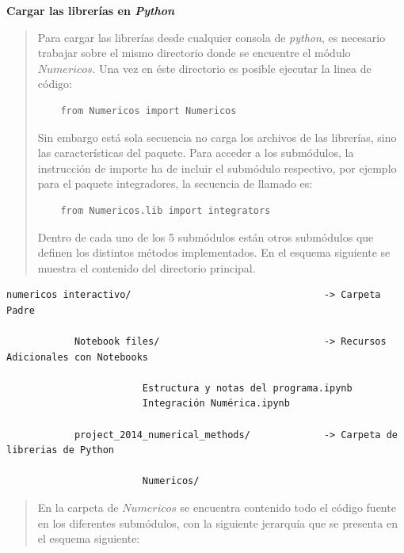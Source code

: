 \documentclass[letterpaper,10pt,oneside]{sphinxmanual}
\theoremstyle{plain}%
\theoremstyle{definition}%
\theoremstyle{remark}%
\begin{document}
\textbf{Cargar las librerías en \textit{Python}}
\begin{quote}
Para cargar las librerías desde cualquier consola de \textit{python}, es necesario trabajar sobre el mismo directorio donde se encuentre el módulo $Numericos$. Una vez en éste directorio es posible ejecutar la linea de código:

	\begin{verbatim}
	from Numericos import Numericos
	\end{verbatim}
	
Sin embargo está sola secuencia no carga los archivos de las librerías, sino las características del paquete. Para acceder a los submódulos, la instrucción de importe ha de incluir el submódulo respectivo, por ejemplo para el paquete integradores, la secuencia de llamado es:

	\begin{verbatim}
	from Numericos.lib import integrators
	\end{verbatim}

Dentro de cada uno de los 5 submódulos están otros submódulos que definen los distintos métodos implementados. En el esquema siguiente se muestra el contenido del directorio principal.
\end{quote}

\begin{verbatim}
numericos interactivo/                                  -> Carpeta Padre
                         					
            Notebook files/               				-> Recursos Adicionales con Notebooks

                        Estructura y notas del programa.ipynb
                        Integración Numérica.ipynb
						    
            project_2014_numerical_methods/    			-> Carpeta de librerias de Python
		                  		
                        Numericos/
\end{verbatim}	

\begin{quote}
En la carpeta de $Numericos$ se encuentra contenido todo el código fuente en los diferentes submódulos, con la siguiente jerarquía que se presenta en el esquema siguiente:
\end{quote}
\end{document}

